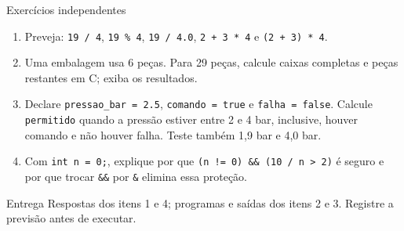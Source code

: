 \begin{frame}{Exercícios independentes}
\small
\begin{enumerate}
\item Preveja: \texttt{19 / 4}, \texttt{19 \% 4}, \texttt{19 / 4.0}, \texttt{2 + 3 * 4} e \texttt{(2 + 3) * 4}.
\item Uma embalagem usa 6 peças. Para 29 peças, calcule caixas completas e peças restantes em C; exiba os resultados.
\item Declare \texttt{pressao\_bar = 2.5}, \texttt{comando = true} e \texttt{falha = false}. Calcule \texttt{permitido} quando a pressão estiver entre 2 e 4 bar, inclusive, houver comando e não houver falha. Teste também 1,9 bar e 4,0 bar.
\item Com \texttt{int n = 0;}, explique por que \texttt{(n != 0) \&\& (10 / n > 2)} é seguro e por que trocar \texttt{\&\&} por \texttt{\&} elimina essa proteção.
\end{enumerate}
\begin{block}{Entrega}
Respostas dos itens 1 e 4; programas e saídas dos itens 2 e 3. Registre a previsão antes de executar.
\end{block}
\end{frame}
